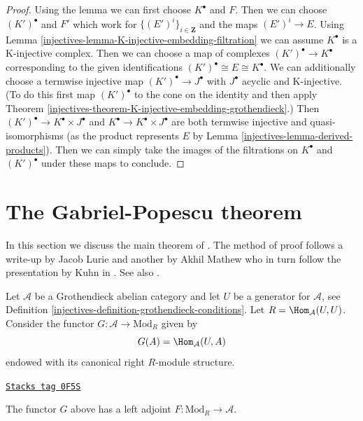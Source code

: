\begin{proof}

Using the lemma we can first choose $K^\bullet$ and $F$.
Then we can choose $(K')^\bullet$ and $F'$ which work for
$\{(E')^i\}_{i \in \mathbf{Z}}$ and the maps $(E')^i \to E$.
Using Lemma \ref{injectives-lemma-K-injective-embedding-filtration}
we can assume $K^\bullet$ is a K-injective complex.
Then we can choose a map of complexes
$(K')^\bullet \to K^\bullet$ corresponding to
the given identifications
$(K')^\bullet \cong E \cong K^\bullet$.
We can additionally choose a termwise injective
map $(K')^\bullet \to J^\bullet$ with
$J^\bullet$ acyclic and K-injective.
(To do this first map $(K')^\bullet$ to the cone on the identity
and then apply Theorem \ref{injectives-theorem-K-injective-embedding-grothendieck}.)
Then $(K')^\bullet \to K^\bullet \times J^\bullet$ and
$K^\bullet \to K^\bullet \times J^\bullet$
are both termwise injective and quasi-isomorphisms
(as the product represents $E$ by Lemma \ref{injectives-lemma-derived-products}).
Then we can simply take the images of the filtrations
on $K^\bullet$ and $(K')^\bullet$ under these maps to conclude.
\end{proof}

\section{The Gabriel-Popescu theorem}
\label{injectives-section-gabriel-popescu}
In this section we discuss the main theorem of \cite{GP}. The method of
proof follows a write-up by Jacob Lurie and another by Akhil Mathew
who in turn follow the presentation by Kuhn in \cite{Kuhn}.
See also \cite{Takeuchi}.

\medskip\noindent
Let $\mathcal{A}$ be a Grothendieck abelian category and let $U$ be a
generator for $\mathcal{A}$, see
Definition \ref{injectives-definition-grothendieck-conditions}.
Let $R = \Hom_\mathcal{A}(U, U)$. Consider the functor
$G : \mathcal{A} \to \text{Mod}_R$ given by
$$
G(A) = \Hom_\mathcal{A}(U, A)
$$
endowed with its canonical right $R$-module structure.

\begin{lemma}
\label{injectives-lemma-gabriel-popescu-left-adjoint}
\href{https://stacks.math.columbia.edu/tag/0F5S}{\texttt{Stacks tag 0F5S}}

The functor $G$ above has a left adjoint
$F : \text{Mod}_R \to \mathcal{A}$.
\end{lemma}


